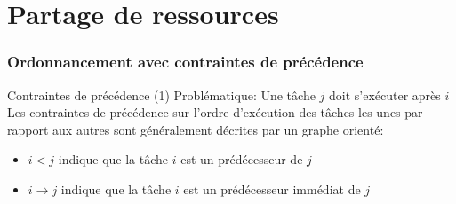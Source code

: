 %
%
%

\part{Partage de ressources}

\begin{frame}
  \partpage
\end{frame}

\begin{frame}
  \tableofcontents
\end{frame}

\section{Ordonnancement avec contraintes de précédence}

\begin{frame}{Contraintes de précédence (1)}
  Problématique: Une tâche $j$ doit s'exécuter après $i$
  \\
  Les contraintes de précédence sur l'ordre d'exécution des tâches les
  unes par rapport aux autres sont généralement décrites par un graphe
  orienté:
  \begin{itemize}
  \item $i < j$ indique que  la tâche $i$ est un prédécesseur de
    $j$
  \item $i  → j$  indique que la  tâche $i$ est  un prédécesseur
    immédiat de $j$
  \end{itemize}
  \begin{center}
    
  \end{center}
\end{frame}

